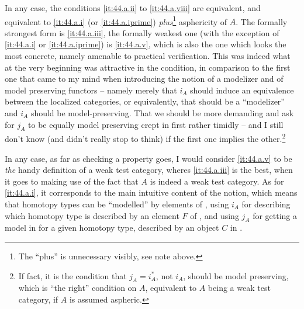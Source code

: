 In any case, the conditions \ref{it:44.a.ii} to \ref{it:44.a.viii} are
equivalent, and equivalent to \ref{it:44.a.i} (or
\ref{it:44.a.iprime}) \emph{plus}\footnote{The ``plus'' is unnecessary
  visibly, see note above.} asphericity of $A$. The formally strongest
form is \ref{it:44.a.iii}, the formally weakest one (with the
exception of \ref{it:44.a.i} or \ref{it:44.a.iprime}) is
\ref{it:44.a.v}, which is also the one which looks the most concrete,
namely amenable to practical verification. This was indeed what at the
very beginning was attractive in the condition, in comparison to the
first one that came to my mind when introducing the notion of a
modelizer and of model preserving functors -- namely merely that $i_A$
should induce an equivalence between the localized categories, or
equivalently, that \Ahat{} should be a ``modelizer'' and $i_A$ should
be model-preserving. That we should be more demanding and ask for
$j_A$ to be equally model preserving crept in first rather timidly --
and I still don't know (and didn't really stop to think) if the first
one implies the other.\footnote{If fact, it is the condition that
  $j_A=i_A^*$, not $i_A$, should be model preserving, which is ``the
  right'' condition on $A$, equivalent to $A$ being a weak test
  category, if $A$ is assumed aspheric.}

In any case, as far as checking a property goes, I would consider
\ref{it:44.a.v} to be \emph{the} handy definition of a weak test
category, wheres \ref{it:44.a.iii} is the best, when it goes to making
use of the fact that $A$ is indeed a weak test category. As for
\ref{it:44.a.i}, it corresponds to the main intuitive content of the
notion, which means that homotopy types can be ``modelled'' by
elements of \Ahat, using $i_A$ for describing which homotopy type is
described by an element $F$ of \Ahat, and using $j_A$ for getting a
model in \Ahat{} for a given homotopy type, described by an object $C$
in \Cat.

